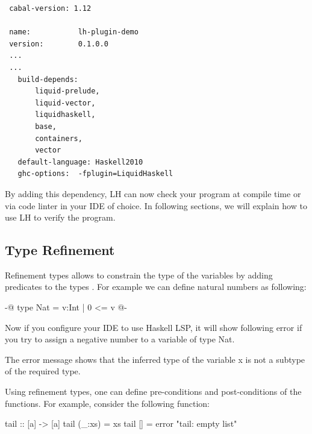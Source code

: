 \documentclass[]{rptuseminar}
\begin{document}
\vspace{1em}
\begin{lstlisting}
 cabal-version: 1.12

 name:           lh-plugin-demo
 version:        0.1.0.0
 ...
 ...
   build-depends:
       liquid-prelude,
       liquid-vector,
       liquidhaskell,
       base,
       containers,
       vector
   default-language: Haskell2010
   ghc-options:  -fplugin=LiquidHaskell
\end{lstlisting}
\vspace{1em}

By adding this dependency, LH can now check your program at compile time or via code linter in your IDE of choice.
In following sections, we will explain how to use LH to verify the program.
\subsection{Type Refinement}
Refinement types allows to constrain the type of the variables by adding predicates to the types 
\cite{jhala_programming_2020}. For example we can define natural numbers as following:

\begin{haskell}
 {-@ type Nat = {v:Int | 0 <= v} @-}
\end{haskell}

Now if you configure your IDE to use Haskell LSP, it will show following error if you try to assign a negative number
to a variable of type Nat.


The error message shows that the inferred type of the variable x is not a subtype of the required type.

Using refinement types, one can define pre-conditions and post-conditions of the functions\cite{jhala_programming_2020}. 
For example, consider the following function:

\begin{haskell}
 tail :: [a] -> [a]
 tail (_:xs) = xs
 tail [] = error "tail: empty list"
\end{haskell}
\end{document}
